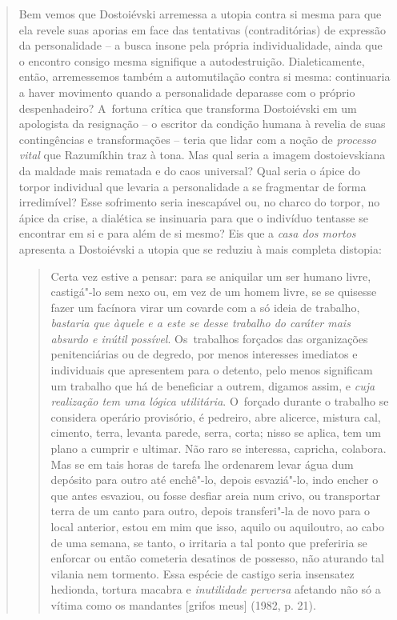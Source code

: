 {\begin{quote}
Bem vemos que Dostoiévski arremessa a utopia contra si mesma para que
ela revele suas aporias em face das tentativas (contraditórias) de
expressão da personalidade -- a busca insone pela própria
individualidade, ainda que o encontro consigo mesma signifique a
autodestruição. Dialeticamente, então, arremessemos também a
automutilação contra si mesma: continuaria a haver movimento quando a
personalidade deparasse com o próprio despenhadeiro? A~fortuna crítica
que transforma Dostoiévski em um apologista da resignação -- o escritor
da condição humana à revelia de suas contingências e transformações --
teria que lidar com a noção de \emph{processo vital} que Razumíkhin traz
à tona. Mas qual seria a imagem dostoievskiana da maldade mais rematada
e do caos universal? Qual seria o ápice do torpor individual que levaria
a personalidade a se fragmentar de forma irredimível? Esse sofrimento
seria inescapável ou, no charco do torpor, no ápice da crise, a
dialética se insinuaria para que o indivíduo tentasse se encontrar em si
e para além de si mesmo? Eis que a \emph{casa dos mortos} apresenta a
Dostoiévski a utopia que se reduziu à mais completa distopia:

\begin{quote}
Certa vez estive a pensar: para se aniquilar um ser humano livre,
castigá"-lo sem nexo ou, em vez de um homem livre, se se quisesse fazer
um facínora virar um covarde com a só ideia de trabalho, \emph{bastaria
que àquele e a este se desse trabalho do caráter mais absurdo e inútil
possível}. Os~trabalhos forçados das organizações penitenciárias ou de
degredo, por menos interesses imediatos e individuais que apresentem
para o detento, pelo menos significam um trabalho que há de beneficiar a
outrem, digamos assim, e \emph{cuja realização tem uma lógica
utilitária}. O~forçado durante o trabalho se considera operário
provisório, é pedreiro, abre alicerce, mistura cal, cimento, terra,
levanta parede, serra, corta; nisso se aplica, tem um plano a cumprir e
ultimar. Não raro se interessa, capricha, colabora. Mas se em tais horas
de tarefa lhe ordenarem levar água dum depósito para outro até enchê"-lo,
depois esvaziá"-lo, indo encher o que antes esvaziou, ou fosse desfiar
areia num crivo, ou transportar terra de um canto para outro, depois
transferi"-la de novo para o local anterior, estou em mim que isso,
aquilo ou aquiloutro, ao cabo de uma semana, se tanto, o irritaria a tal
ponto que preferiria se enforcar ou então cometeria desatinos de
possesso, não aturando tal vilania nem tormento. Essa espécie de castigo
seria insensatez hedionda, tortura macabra e \emph{inutilidade perversa}
afetando não só a vítima como os mandantes {[}grifos meus{]} (1982, p.
21).
\end{quote}


\end{quote}}
